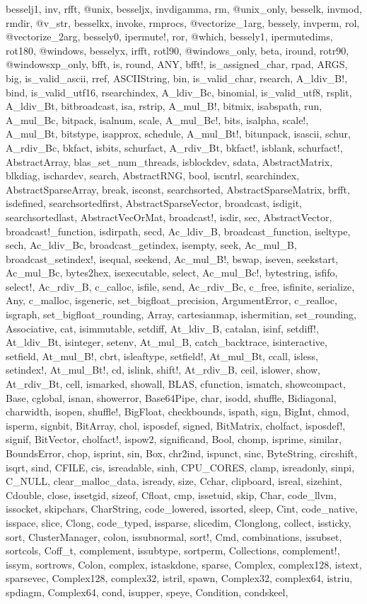 besselj1, inv, rfft, @unix, besseljx, invdigamma, rm, @unix_only, besselk, invmod, rmdir, @v_str, besselkx, invoke, rmprocs, @vectorize_1arg, bessely, invperm, rol, @vectorize_2arg, bessely0, ipermute!, ror, @which, bessely1, ipermutedims, rot180, @windows, besselyx, irfft, rotl90, @windows_only, beta, iround, rotr90, @windowsxp_only, bfft, is, round, ANY, bfft!, is_assigned_char, rpad, ARGS, big, is_valid_ascii, rref, ASCIIString, bin, is_valid_char, rsearch, A_ldiv_B!, bind, is_valid_utf16, rsearchindex, A_ldiv_Bc, binomial, is_valid_utf8, rsplit, A_ldiv_Bt, bitbroadcast, isa, rstrip, A_mul_B!, bitmix, isabspath, run, A_mul_Bc, bitpack, isalnum, scale, A_mul_Bc!, bits, isalpha, scale!, A_mul_Bt, bitstype, isapprox, schedule, A_mul_Bt!, bitunpack, isascii, schur, A_rdiv_Bc, bkfact, isbits, schurfact, A_rdiv_Bt, bkfact!, isblank, schurfact!, AbstractArray, blas_set_num_threads, isblockdev, sdata, AbstractMatrix, blkdiag, ischardev, search, AbstractRNG, bool, iscntrl, searchindex, AbstractSparseArray, break, isconst, searchsorted, AbstractSparseMatrix, brfft, isdefined, searchsortedfirst, AbstractSparseVector, broadcast, isdigit, searchsortedlast, AbstractVecOrMat, broadcast!, isdir, sec, AbstractVector, broadcast!_function, isdirpath, secd, Ac_ldiv_B, broadcast_function, iseltype, sech, Ac_ldiv_Bc, broadcast_getindex, isempty, seek, Ac_mul_B, broadcast_setindex!, isequal, seekend, Ac_mul_B!, bswap, iseven, seekstart, Ac_mul_Bc, bytes2hex, isexecutable, select, Ac_mul_Bc!, bytestring, isfifo, select!, Ac_rdiv_B, c_calloc, isfile, send, Ac_rdiv_Bc, c_free, isfinite, serialize, Any, c_malloc, isgeneric, set_bigfloat_precision, ArgumentError, c_realloc, isgraph, set_bigfloat_rounding, Array, cartesianmap, ishermitian, set_rounding, Associative, cat, isimmutable, setdiff, At_ldiv_B, catalan, isinf, setdiff!, At_ldiv_Bt, isinteger, setenv, At_mul_B, catch_backtrace, isinteractive, setfield, At_mul_B!, cbrt, isleaftype, setfield!, At_mul_Bt, ccall, isless, setindex!, At_mul_Bt!, cd, islink, shift!, At_rdiv_B, ceil, islower, show, At_rdiv_Bt, cell, ismarked, showall, BLAS, cfunction, ismatch, showcompact, Base, cglobal, isnan, showerror, Base64Pipe, char, isodd, shuffle, Bidiagonal, charwidth, isopen, shuffle!, BigFloat, checkbounds, ispath, sign, BigInt, chmod, isperm, signbit, BitArray, chol, isposdef, signed, BitMatrix, cholfact, isposdef!, signif, BitVector, cholfact!, ispow2, significand, Bool, chomp, isprime, similar, BoundsError, chop, isprint, sin, Box, chr2ind, ispunct, sinc, ByteString, circshift, isqrt, sind, CFILE, cis, isreadable, sinh, CPU_CORES, clamp, isreadonly, sinpi, C_NULL, clear_malloc_data, isready, size, Cchar, clipboard, isreal, sizehint, Cdouble, close, issetgid, sizeof, Cfloat, cmp, issetuid, skip, Char, code_llvm, issocket, skipchars, CharString, code_lowered, issorted, sleep, Cint, code_native, isspace, slice, Clong, code_typed, issparse, slicedim, Clonglong, collect, issticky, sort, ClusterManager, colon, issubnormal, sort!, Cmd, combinations, issubset, sortcols, Coff_t, complement, issubtype, sortperm, Collections, complement!, issym, sortrows, Colon, complex, istaskdone, sparse, Complex, complex128, istext, sparsevec, Complex128, complex32, istril, spawn, Complex32, complex64, istriu, spdiagm, Complex64, cond, isupper, speye, Condition, condskeel, 